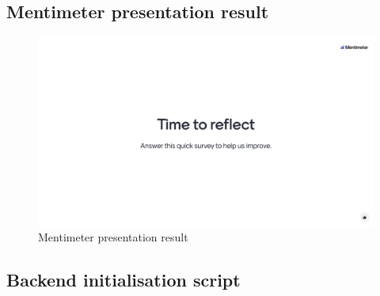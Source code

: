 \documentclass[
]{article}
\begin{document}
\hypertarget{mentimeter-presentation-result}{%
\subsection*{Mentimeter presentation
result}\label{mentimeter-presentation-result}}

\begin{figure}

{\centering \includegraphics{../appendices/MentimeterPresentation.pdf}

}

\caption{\label{fig-presentation-results}Mentimeter presentation result}

\end{figure}

\newpage{}

\hypertarget{backend-initialisation-script}{%
\subsection*{Backend initialisation
script}\label{backend-initialisation-script}}
\end{document}
